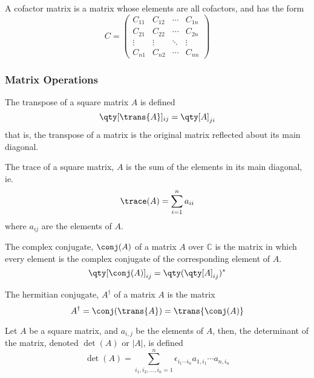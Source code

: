 \begin{definition}
  A cofactor matrix is a matrix whose elements are all cofactors, and has the form
\[ C = 
\begin{pmatrix}
  C_{11} & C_{12} & \cdots & C_{1n} \\
  C_{21} & C_{22} & \cdots & C_{2n} \\
  \vdots & \vdots & \ddots & \vdots \\
  C_{n1} & C_{n2} & \cdots & C_{nn}
\end{pmatrix}
\]
\end{definition}

\subsubsection{Matrix Operations}
\label{sec:matops}

\begin{definition}
  The transpose of a square matrix $A$ is defined
  \[ \qty[\trans{A}]_{ij} = \qty[A]_{ji} \] that is, the transpose of
  a matrix is the original matrix reflected about its main diagonal.
\end{definition}

\begin{definition}
  The trace of a square matrix, $A$ is the sum of the elements in its main diagonal, ie.\
  \[ \trace(A) = \sum^n_{i=1} a_{ii}\] where $a_{ij}$ are the elements
  of $A$.
\end{definition}

\begin{definition}
  The complex conjugate, $\conj(A)$ of a matrix $A$ over $\mathbb{C}$
  is the matrix in which every element is the complex conjugate of the
  corresponding element of $A$.
  \[ \qty[\conj(A)]_{ij} = \qty( \qty[A]_{ij} )^{*} \]
\end{definition}

\begin{definition}
  The hermitian conjugate, $A^{\dagger}$ of a matrix $A$ is the matrix
  \[ A^{\dagger} = \conj(\trans{A}) = \trans{\conj(A)} \]
\end{definition}

\begin{definition}
  Let $A$ be a square matrix, and $a_{i,j}$ be the elements of $A$, then, the
  determinant of the matrix, denoted $\det(A)$ or $|A|$, is defined
  \[ \det(A) = \sum_{i_1, i_2, \dots, i_n = 1}^n \epsilon_{i_1 \cdots
    i_n} a_{1,i_1} \cdots a_{n,i_n} \]
\end{definition}

